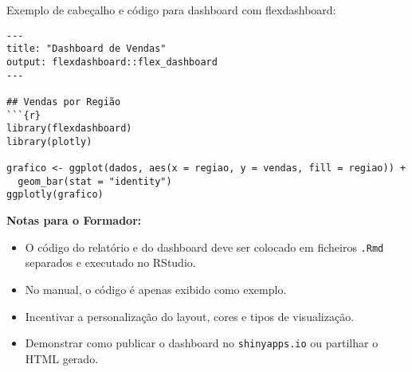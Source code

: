 Exemplo de cabeçalho e código para dashboard com flexdashboard:

\begin{lstlisting}
---
title: "Dashboard de Vendas"
output: flexdashboard::flex_dashboard
---

## Vendas por Região
```{r}
library(flexdashboard)
library(plotly)

grafico <- ggplot(dados, aes(x = regiao, y = vendas, fill = regiao)) +
  geom_bar(stat = "identity")
ggplotly(grafico)
\end{lstlisting}

\textbf{Notas para o Formador:} \begin{itemize} \item O código do relatório e do dashboard deve ser colocado em ficheiros \texttt{.Rmd} separados e executado no RStudio. \item No manual, o código é apenas exibido como exemplo. \item Incentivar a personalização do layout, cores e tipos de visualização. \item Demonstrar como publicar o dashboard no \texttt{shinyapps.io} ou partilhar o HTML gerado. \end{itemize}